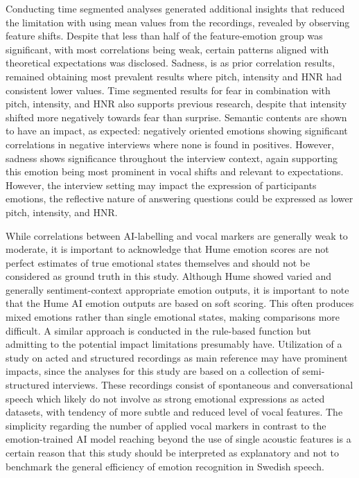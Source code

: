 \medskip 
Conducting time segmented analyses generated additional insights that reduced the limitation with using mean values from the recordings, revealed by observing feature shifts. Despite that less than half of the feature-emotion group was significant, with most correlations being weak, certain patterns aligned with theoretical expectations was disclosed. 
Sadness, is as prior correlation results, remained obtaining most prevalent results where pitch, intensity and HNR had consistent lower values. Time segmented results for fear in combination with pitch, intensity, and HNR also supports previous research, despite that intensity shifted more negatively towards fear than surprise. 
Semantic contents are shown to have an impact, as expected: negatively oriented emotions showing significant correlations in negative interviews where none is found in positives. However, sadness shows significance throughout the interview context, again supporting this emotion being most prominent in vocal shifts and relevant to expectations. 
However, the interview setting may impact the expression of participants emotions, the reflective nature of answering questions could be expressed as lower pitch, intensity, and HNR. 

While correlations between AI-labelling and vocal markers are generally weak to moderate, it is important to acknowledge that Hume emotion scores are not perfect estimates of true emotional states themselves and should not be considered as ground truth in this study. Although Hume showed varied and generally sentiment-context appropriate emotion outputs, it is important to note that the Hume AI emotion outputs are based on soft scoring. 
This often produces mixed emotions rather than single emotional states, making comparisons more diﬀicult. A similar approach is conducted in the rule-based function but admitting to the potential impact limitations presumably have. Utilization of a study on acted and structured recordings as main reference may have prominent impacts, since the analyses for this study are based on a collection of semi-structured interviews. 
These recordings consist of spontaneous and conversational speech which likely do not involve as strong emotional expressions as acted datasets, with tendency of more subtle and reduced level of vocal features. The simplicity regarding the number of applied vocal markers in contrast to the emotion-trained AI model reaching beyond the use of single acoustic features is a certain reason that this study should be interpreted as explanatory and not to benchmark the general efficiency of emotion recognition in Swedish speech.    
 
